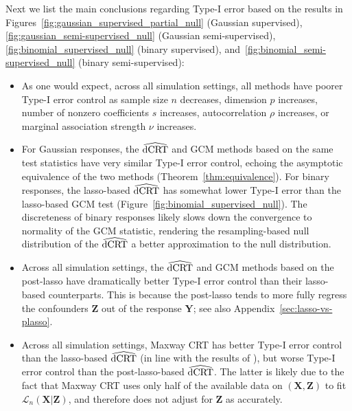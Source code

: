 \documentclass[12pt]{article}
\theoremstyle{definition}
\theoremstyle{remark}
\newcommand{\prx}{\bm X}								%
\newcommand{\prz}{\bm Z}								%
\newcommand{\pry}{{\bm Y}}								%
\newcommand{\law}{\mathcal L}							%
\newcommand{\dCRThat}{\widehat{\textnormal{dCRT}}}		%
\begin{document}
	Next we list the main conclusions regarding Type-I error based on the results in Figures~\ref{fig:gaussian_supervised_partial_null} (Gaussian supervised), \ref{fig:gaussian_semi-supervised_null} (Gaussian semi-supervised), \ref{fig:binomial_supervised_null} (binary supervised), and~\ref{fig:binomial_semi-supervised_null} (binary semi-supervised): 
	\begin{itemize}
		\item As one would expect, across all simulation settings, all methods have poorer Type-I error control as sample size $n$ decreases, dimension $p$ increases, number of nonzero coefficients $s$ increases, autocorrelation $\rho$ increases, or marginal association strength $\nu$ increases.
		\item For Gaussian responses, the $\dCRThat$ and GCM methods based on the same test statistics have very similar Type-I error control, echoing the asymptotic equivalence of the two methods (Theorem~\ref{thm:equivalence}). For binary responses, the lasso-based $\dCRThat$ has somewhat lower Type-I error than the lasso-based GCM test (Figure~\ref{fig:binomial_supervised_null}). The discreteness of binary responses likely slows down the convergence to normality of the GCM statistic, rendering the resampling-based null distribution of the $\dCRThat$ a better approximation to the null distribution.
		\item Across all simulation settings, the $\dCRThat$ and GCM methods based on the post-lasso have dramatically better Type-I error control than their lasso-based counterparts. This is because the post-lasso tends to more fully regress the confounders $\prz$ out of the response $\pry$; see also Appendix~\ref{sec:lasso-vs-plasso}.
		\item Across all simulation settings, Maxway CRT has better Type-I error control than the lasso-based $\dCRThat$ (in line with the results of \cite{Li2022}), but worse Type-I error control than the post-lasso-based $\dCRThat$. The latter is likely due to the fact that Maxway CRT uses only half of the available data on $(\prx, \prz)$ to fit $\law_n(\prx|\prz)$, and therefore does not adjust for $\prz$ as accurately.
	\end{itemize}
	
\end{document}
